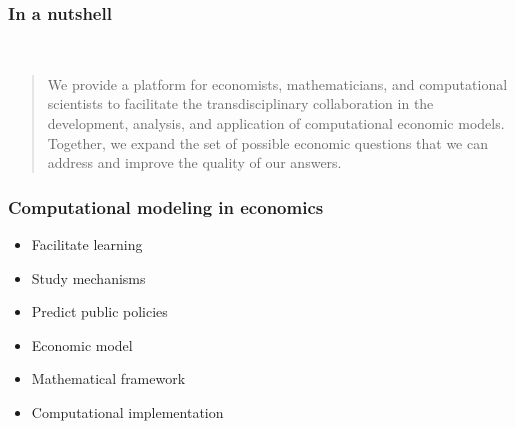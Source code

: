 \begin{frame}\frametitle{In a nutshell}
\hspace{1.5cm}
\\
\vspace{1cm}
\begin{quote}
	\large
	\raggedright
	We provide a platform for economists, mathematicians, and computational scientists to facilitate the transdisciplinary collaboration in the development, analysis, and application of computational economic models. Together, we expand the set of possible economic questions that we can address and improve the quality of our	answers.
\end{quote}


\end{frame}
\begin{frame}\frametitle{Computational modeling in economics}

	\begin{multicols}{2}
	\vspace{0.3cm}
	\begin{itemize}\setlength\itemsep{1em}
	\item Facilitate learning
	\item Study mechanisms
	\item Predict public policies
	\end{itemize}

	\pause

  \vspace{0.3cm}
	\begin{itemize}\setlength\itemsep{1em}
	\item Economic model
	\item Mathematical framework
	\item Computational implementation
	\end{itemize}
	\end{multicols}

\end{frame}

